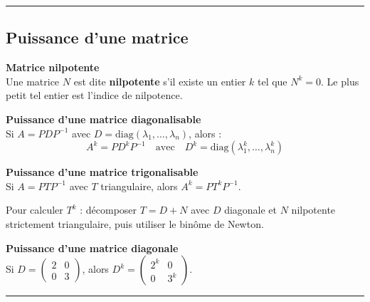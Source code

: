 \documentclass[../PolyS4.tex]{subfiles}
\begin{document}
\vspace{1em}
\hrule
\vspace{1em}

\subsection{Puissance d'une matrice}

\begin{Def}\textbf{Matrice nilpotente}\\

Une matrice $N$ est dite \textbf{nilpotente} s'il existe un entier $k$ tel que $N^k = 0$. Le plus petit tel entier est l'indice de nilpotence.
\end{Def}

\begin{Prop}\textbf{Puissance d'une matrice diagonalisable}\\

Si $A = PDP^{-1}$ avec $D = \mathrm{diag}(\lambda_1, \ldots, \lambda_n)$, alors :
$$A^k = PD^kP^{-1} \quad \text{avec} \quad D^k = \mathrm{diag}(\lambda_1^k, \ldots, \lambda_n^k)$$
\end{Prop}

\begin{Prop}\textbf{Puissance d'une matrice trigonalisable}\\

Si $A = PTP^{-1}$ avec $T$ triangulaire, alors $A^k = PT^kP^{-1}$.

Pour calculer $T^k$ : décomposer $T = D + N$ avec $D$ diagonale et $N$ nilpotente strictement triangulaire, puis utiliser le binôme de Newton.
\end{Prop}

\begin{Ex}\textbf{Puissance d'une matrice diagonale}\\

Si $D = \begin{pmatrix} 2 & 0 \\ 0 & 3 \end{pmatrix}$, alors $D^k = \begin{pmatrix} 2^k & 0 \\ 0 & 3^k \end{pmatrix}$.
\end{Ex}

\vspace{1em}
\hrule
\vspace{1em}

\end{document}
